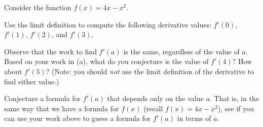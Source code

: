 \begin{pa} \label{PA:1.4}
Consider the function $f(x) = 4x - x^2$.
\ba
	\item Use the limit definition to compute the following derivative values:  $f'(0)$, $f'(1)$, $f'(2)$, and $f'(3)$.
	\item Observe that the work to find $f'(a)$ is the same, regardless of the value of $a$.  Based on your work in (a), what do you conjecture is the value of $f'(4)$?  How about $f'(5)$?  (Note: you should \emph{not} use the limit definition of the derivative to find either value.)
	\item Conjecture a formula for $f'(a)$ that depends only on the value $a$.  That is, in the same way that we have a formula for $f(x)$ (recall $f(x) = 4x - x^2$), see if you can use your work above to guess a formula for $f'(a)$ in terms of $a$.
\ea
\end{pa} \afterpa